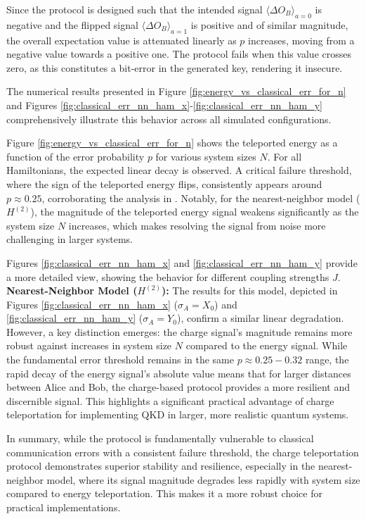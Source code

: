 

Since the protocol is designed such that the intended signal $\langle\Delta O_{B}\rangle_{a=0}$ is negative and the flipped signal $\langle\Delta O_{B}\rangle_{a=1}$ is positive and of similar magnitude, the overall expectation value is attenuated linearly as $p$ increases, moving from a negative value towards a positive one. The protocol fails when this value crosses zero, as this constitutes a bit-error in the generated key, rendering it insecure.

The numerical results presented in Figure \ref{fig:energy_vs_classical_err_for_n} and Figures \ref{fig:classical_err_nn_ham_x}-\ref{fig:classical_err_nn_ham_y} comprehensively illustrate this behavior across all simulated configurations.

Figure \ref{fig:energy_vs_classical_err_for_n} shows the teleported energy as a function of the error probability $p$ for various system sizes $N$. For all Hamiltonians, the expected linear decay is observed. A critical failure threshold, where the sign of the teleported energy flips, consistently appears around $p \approx 0.25$, corroborating the analysis in \cite{QKDbyQET}. Notably, for the nearest-neighbor model ($H^{(2)}$), the magnitude of the teleported energy signal weakens significantly as the system size $N$ increases, which makes resolving the signal from noise more challenging in larger systems.

Figures \ref{fig:classical_err_nn_ham_x} and \ref{fig:classical_err_nn_ham_y} provide a more detailed view, showing the behavior for different coupling strengths $J$.
\textbf{Nearest-Neighbor Model ($H^{(2)}$):} The results for this model, depicted in Figures \ref{fig:classical_err_nn_ham_x} ($\sigma_A = X_0$) and \ref{fig:classical_err_nn_ham_y} ($\sigma_A = Y_0$), confirm a similar linear degradation. However, a key distinction emerges: the charge signal's magnitude remains more robust against increases in system size $N$ compared to the energy signal. While the fundamental error threshold remains in the same $p \approx 0.25-0.32$ range, the rapid decay of the energy signal's absolute value means that for larger distances between Alice and Bob, the charge-based protocol provides a more resilient and discernible signal. This highlights a significant practical advantage of charge teleportation for implementing QKD in larger, more realistic quantum systems.

In summary, while the protocol is fundamentally vulnerable to classical communication errors with a consistent failure threshold, the charge teleportation protocol demonstrates superior stability and resilience, especially in the nearest-neighbor model, where its signal magnitude degrades less rapidly with system size compared to energy teleportation. This makes it a more robust choice for practical implementations.

